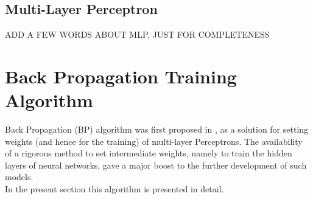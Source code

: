 \documentclass[%
    corpo=11pt,
    twoside,
    stile=classica,
    oldstyle,
    autoretitolo,
    tipotesi=magistrale,
    greek,
    evenboxes,
    english
]{toptesi}
\begin{document}
\subsection{Multi-Layer Perceptron}
ADD A FEW WORDS ABOUT MLP, JUST FOR COMPLETENESS

\newpage
\section{Back Propagation Training Algorithm}
Back Propagation (BP) algorithm was first proposed in \cite{back}, as a solution for setting weights (and hence for the training) of multi-layer Perceptrons. 
The availability of a rigorous method to set intermediate weights, namely to train the hidden layers of neural networks, gave a major boost to the further development of such models. \\
In the present section this algorithm is presented in detail. \\
\end{document}
